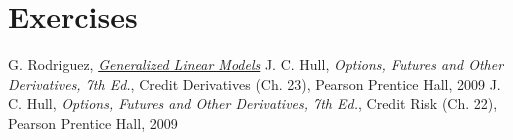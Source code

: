 \section*{Exercises}


\begin{thebibliography}{9}
 G. Rodriguez, \href{https://data.princeton.edu/wws509/notes/c7s1}{\emph{Generalized Linear Models}} 
 J. C. Hull, \emph{Options, Futures and Other Derivatives, 7th Ed.}, Credit Derivatives (Ch. 23), Pearson Prentice Hall, 2009
 J. C. Hull, \emph{Options, Futures and Other Derivatives, 7th Ed.}, Credit Risk (Ch. 22), Pearson Prentice Hall, 2009
\end{thebibliography}
